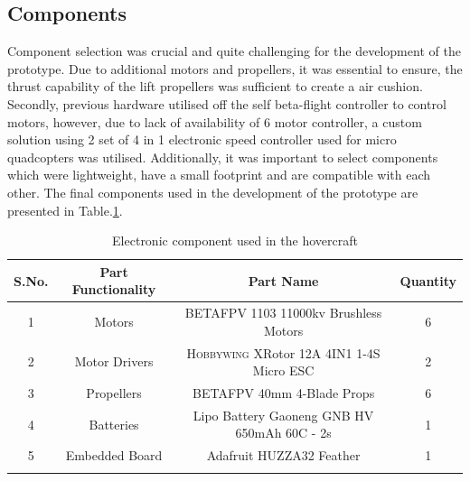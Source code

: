 \documentclass[12pt,titlepage]{article}
\begin{document}
\subsection{Components}
Component selection was crucial and quite challenging for the development of the prototype. Due to additional motors and propellers, it was essential to ensure, the thrust capability of the lift propellers was sufficient to create a air cushion. Secondly, previous hardware utilised off the self beta-flight controller to control motors, however, due to lack of availability of 6 motor controller, a custom solution using 2 set of 4 in 1 electronic speed controller used for micro quadcopters was utilised. Additionally, it was important to select components which were lightweight, have a small footprint and are compatible with each other. The final components used in the development of the prototype are presented in Table.\ref{component}.
\newpage

\begin{center}
\begin{longtable}[c]{|c|c|c|c|}
\hline \rowcolor{gray!30}
S.No. & Part Functionality & Part Name & Quantity \\ \hline
\endfirsthead
\endhead
1 & Motors & \textsc{BETAFPV} 1103 11000kv Brushless Motors   &6  \\ \hline
2 & Motor Drivers & \textsc{Hobbywing} XRotor 12A 4IN1 1-4S Micro ESC & 2 \\ \hline
3 & Propellers & \textsc{BETAFPV} 40mm 4-Blade Props & 6 \\ \hline
4 & Batteries & Lipo Battery Gaoneng GNB HV 650mAh 60C - 2s & 1 \\ \hline
5 & Embedded Board & Adafruit HUZZA32 Feather & 1 \\ \hline 
\caption{Electronic component used in the hovercraft}
\label{component}
\end{longtable}
\end{center}
\end{document}
